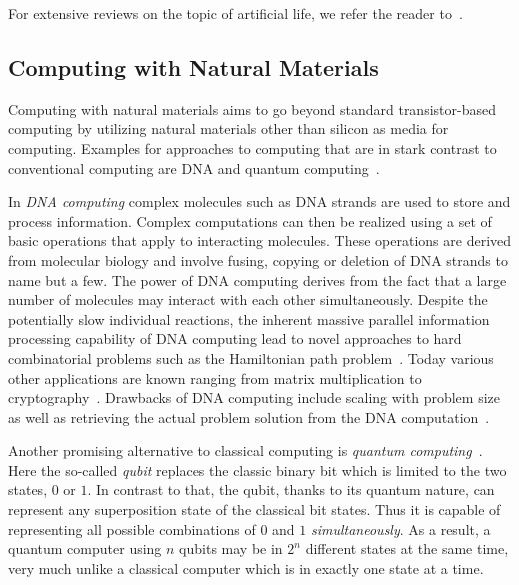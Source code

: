 		For extensive reviews on the topic of artificial life, we refer the reader to~\cite{Langton:1995:ALO:526815,Boden:1996:PAL:525139,bedau2000open,taylor1993artificial}.

		\FloatBarrier

	\subsection{Computing with Natural Materials}

		Computing with natural materials aims to go beyond standard transistor-based computing by utilizing natural materials other than silicon as media for computing. Examples for approaches to computing that are in stark contrast to conventional computing are DNA and quantum computing~\cite{de2007fundamentals}. 

		In \emph{DNA computing} complex molecules such as DNA strands are used to store and process information. Complex computations can then be realized using a set of basic operations that apply to interacting molecules. These operations are derived from molecular biology and involve fusing, copying or deletion of DNA strands to name but a few. The power of DNA computing derives from the fact that a large number of molecules may interact with each other simultaneously. Despite the potentially slow individual reactions, the inherent massive parallel information processing capability of DNA computing lead to novel approaches to hard combinatorial problems such as the Hamiltonian path problem~\cite{adleman1994molecular}. Today various other applications are known ranging from matrix multiplication to cryptography~\cite{puaun2000computing,boneh1996computational,lipton1996breaking,oliver1998computation}. Drawbacks of DNA computing include scaling with problem size as well as retrieving the actual problem solution from the DNA computation~\cite{de2007fundamentals}.

		Another promising alternative to classical computing is \emph{quantum computing}~\cite{Nielsen:2011:QCQ:1972505}. Here the so-called \emph{qubit} replaces the classic binary bit which is limited to the two states, $0$ or $1$. In contrast to that, the qubit, thanks to its quantum nature, can represent any superposition state of the classical bit states. Thus it is capable of representing all possible combinations of $0$ and $1$ \emph{simultaneously}. As a result, a quantum computer using $n$ qubits may be in $2^n$ different states at the same time, very much unlike a classical computer which is in exactly one state at a time. 

